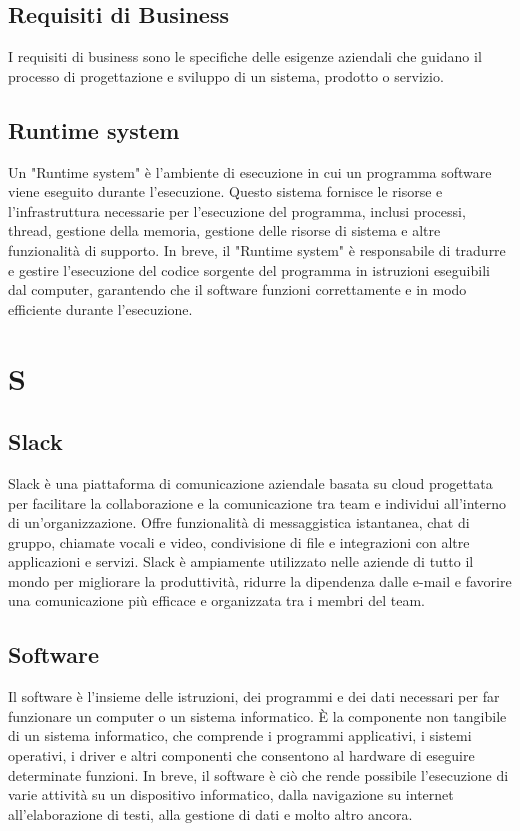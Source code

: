 \documentclass{article}
\begin{document}
\subsection{Requisiti di Business}
I  requisiti di business sono le specifiche delle esigenze aziendali che guidano il processo di progettazione e sviluppo di un sistema, prodotto o servizio.

\subsection{Runtime system}
Un "Runtime system" è l'ambiente di esecuzione in cui un programma software viene eseguito durante l'esecuzione. Questo sistema fornisce le risorse e l'infrastruttura necessarie per l'esecuzione del programma, inclusi processi, thread, gestione della memoria, gestione delle risorse di sistema e altre funzionalità di supporto. In breve, il "Runtime system" è responsabile di tradurre e gestire l'esecuzione del codice sorgente del programma in istruzioni eseguibili dal computer, garantendo che il software funzioni correttamente e in modo efficiente durante l'esecuzione.

\section{S}
\subsection{Slack}
Slack è una piattaforma di comunicazione aziendale basata su cloud progettata per facilitare la collaborazione e la comunicazione tra team e individui all'interno di un'organizzazione. Offre funzionalità di messaggistica istantanea, chat di gruppo, chiamate vocali e video, condivisione di file e integrazioni con altre applicazioni e servizi. Slack è ampiamente utilizzato nelle aziende di tutto il mondo per migliorare la produttività, ridurre la dipendenza dalle e-mail e favorire una comunicazione più efficace e organizzata tra i membri del team.

\subsection{Software}
Il software è l'insieme delle istruzioni, dei programmi e dei dati necessari per far funzionare un computer o un sistema informatico. È la componente non tangibile di un sistema informatico, che comprende i programmi applicativi, i sistemi operativi, i driver e altri componenti che consentono al hardware di eseguire determinate funzioni. In breve, il software è ciò che rende possibile l'esecuzione di varie attività su un dispositivo informatico, dalla navigazione su internet all'elaborazione di testi, alla gestione di dati e molto altro ancora.
\end{document}
